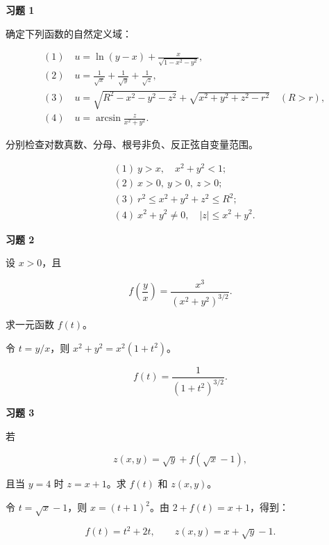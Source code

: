 \begin{exercisebox}
\textbf{习题 1}

确定下列函数的自然定义域：

\[
      \begin{aligned}
      &(1)\quad u=\ln(y-x)+\frac{x}{\sqrt{1-x^2-y^2}},\\
      &(2)\quad u=\frac1{\sqrt x}+\frac1{\sqrt y}+\frac1{\sqrt z},\\
      &(3)\quad u=\sqrt{R^2-x^2-y^2-z^2}+\sqrt{x^2+y^2+z^2-r^2}\quad(R> r),\\
      &(4)\quad u=\arcsin\frac{z}{x^2+y^2}.
      \end{aligned}
      \]

\begin{hintbox}
分别检查对数真数、分母、根号非负、反正弦自变量范围。

\[
        \begin{aligned}
        &(1)\ y> x,\quad x^2+y^2<1;\\
        &(2)\ x>0,\ y>0,\ z>0;\\
        &(3)\ r^2\le x^2+y^2+z^2\le R^2;\\
        &(4)\ x^2+y^2\ne0,\quad |z|\le x^2+y^2.
        \end{aligned}
        \]
\end{hintbox}
\end{exercisebox}

\begin{exercisebox}
\textbf{习题 2}

设 \(x>0\)，且

\[
        f\!\left(\frac yx\right)=\frac{x^3}{(x^2+y^2)^{3/2}}.
      \]

求一元函数 \(f(t)\)。

\begin{hintbox}
令 \(t=y/x\)，则 \(x^2+y^2=x^2(1+t^2)\)。

\[
          f(t)=\frac{1}{(1+t^2)^{3/2}}.
        \]
\end{hintbox}
\end{exercisebox}

\begin{exercisebox}
\textbf{习题 3}

若

\[
        z(x,y)=\sqrt y+f(\sqrt x-1),
      \]

且当 \(y=4\) 时 \(z=x+1\)。求 \(f(t)\) 和 \(z(x,y)\)。

\begin{hintbox}
令 \(t=\sqrt x-1\)，则 \(x=(t+1)^2\)。由 \(2+f(t)=x+1\)，得到：

\[
          f(t)=t^2+2t,\qquad z(x,y)=x+\sqrt y-1.
        \]
\end{hintbox}
\end{exercisebox}


